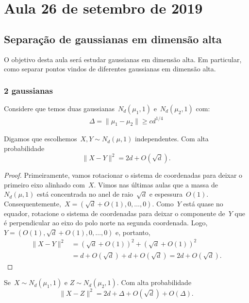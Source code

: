 \section{Aula 26 de setembro de 2019}
\label{2019_09_26}

\subsection{Separação de gaussianas em dimensão alta}

O objetivo desta aula será estudar gaussianas em dimensão alta. Em
particular, como separar pontos vindos de diferentes gaussianas em
dimensão alta.

\subsubsection{2 gaussianas}

Considere que temos duas gaussianas~$N_{d}(\mu_{1},1)$
e~$N_{d}(\mu_{2},1)$ com:
\begin{align*}
\Delta = \lVert \mu_{1} - \mu_{2} \rVert \geq cd^{1/4}
\end{align*}

\begin{fato}
  Digamos que escolhemos~$X,Y \sim N_{d}(\mu, 1)$ independentes. Com
  alta probabilidade~$$\lVert X - Y \rVert^2 = 2d + O(\sqrt{d}).$$
\end{fato}

\begin{proof}
  Primeiramente, vamos rotacionar o sistema de coordenadas para deixar
  o primeiro eixo alinhado com~$X$. Vimos nas últimas aulas que a
  massa de~$N_{d}(\mu, 1)$ está concentrada no anel de raio~$\sqrt{d}$
  e espessura~$O(1)$.
  Consequentemente,~$X=(\sqrt{d} + O(1),0,\dots,0)$. Como~$Y$ está
  quase no equador, rotacione o sistema de coordenadas para deixar o
  componente de~$Y$ que é perpendicular ao eixo do polo norte na
  segunda coordenada. Logo,~$Y=(O(1),\sqrt{d}+O(1),0,\dots,0)$ e,
  portanto,
  \begin{align*}
    \lVert X-Y \rVert^2 &= (\sqrt{d}+O(1))^{2} + (\sqrt{d}+O(1))^{2}\\
                        &= d + O(\sqrt{d}) + d + O(\sqrt{d}) = 2d + O(\sqrt{d}).
  \end{align*}
\end{proof}

\begin{fato}
  Se~$X \sim N_{d}(\mu_{1},1)$ e $Z \sim N_{d}(\mu_{2},1)$. Com alta
  probabilidade~$$\lVert X - Z \rVert^{2} = 2d + \Delta + O(\sqrt{d}) + O(\Delta).$$
\end{fato}

